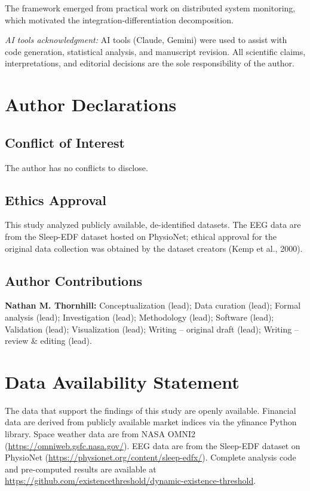 \documentclass[aip,cha,reprint,amsmath,amssymb]{revtex4-2}
\begin{document}
\begin{acknowledgments}
The framework emerged from practical work on distributed system monitoring, which motivated the integration-differentiation decomposition.

\emph{AI tools acknowledgment:} AI tools (Claude, Gemini) were used to assist with code generation, statistical analysis, and manuscript revision. All scientific claims, interpretations, and editorial decisions are the sole responsibility of the author.
\end{acknowledgments}

\section*{Author Declarations}

\subsection*{Conflict of Interest}
The author has no conflicts to disclose.

\subsection*{Ethics Approval}
This study analyzed publicly available, de-identified datasets. The EEG data are from the Sleep-EDF dataset hosted on PhysioNet; ethical approval for the original data collection was obtained by the dataset creators (Kemp et al., 2000).

\subsection*{Author Contributions}
\textbf{Nathan M. Thornhill:} Conceptualization (lead); Data curation (lead); Formal analysis (lead); Investigation (lead); Methodology (lead); Software (lead); Validation (lead); Visualization (lead); Writing -- original draft (lead); Writing -- review \& editing (lead).

\section*{Data Availability Statement}

The data that support the findings of this study are openly available. Financial data are derived from publicly available market indices via the yfinance Python library. Space weather data are from NASA OMNI2 (\url{https://omniweb.gsfc.nasa.gov/}). EEG data are from the Sleep-EDF dataset on PhysioNet (\url{https://physionet.org/content/sleep-edfx/}). Complete analysis code and pre-computed results are available at \url{https://github.com/existencethreshold/dynamic-existence-threshold}.
\end{document}
